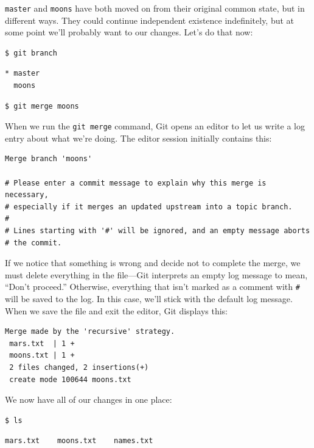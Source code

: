 \documentclass{book}
\begin{document}
\texttt{master} and \texttt{moons} have both moved on from their
original common state, but in different ways. They could continue
independent existence indefinitely, but at some point we'll probably
want to  our changes. Let's do that now:

\begin{verbatim}
$ git branch
\end{verbatim}

\begin{verbatim}
* master
  moons
\end{verbatim}

\begin{verbatim}
$ git merge moons
\end{verbatim}

When we run the \texttt{git merge} command, Git opens an editor to let
us write a log entry about what we're doing. The editor session
initially contains this:

\begin{verbatim}
Merge branch 'moons'

# Please enter a commit message to explain why this merge is necessary,
# especially if it merges an updated upstream into a topic branch.
#
# Lines starting with '#' will be ignored, and an empty message aborts
# the commit.
\end{verbatim}

If we notice that something is wrong and decide not to complete the
merge, we must delete everything in the file---Git interprets an empty
log message to mean, ``Don't proceed.'' Otherwise, everything that isn't
marked as a comment with \texttt{\#} will be saved to the log. In this
case, we'll stick with the default log message. When we save the file
and exit the editor, Git displays this:

\begin{verbatim}
Merge made by the 'recursive' strategy.
 mars.txt  | 1 +
 moons.txt | 1 +
 2 files changed, 2 insertions(+)
 create mode 100644 moons.txt
\end{verbatim}

We now have all of our changes in one place:

\begin{verbatim}
$ ls
\end{verbatim}

\begin{verbatim}
mars.txt    moons.txt    names.txt
\end{verbatim}
\end{document}
